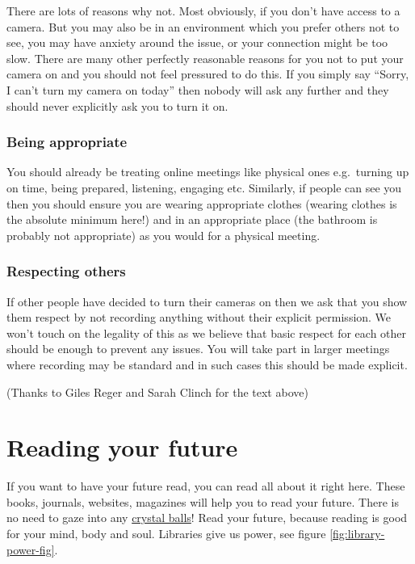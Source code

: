 \documentclass[
]{book}
\begin{document}
There are lots of reasons why not. Most obviously, if you don't have access to a camera. But you may also be in an environment which you prefer others not to see, you may have anxiety around the issue, or your connection might be too slow. There are many other perfectly reasonable reasons for you not to put your camera on and you should not feel pressured to do this. If you simply say ``Sorry, I can't turn my camera on today'' then nobody will ask any further and they should never explicitly ask you to turn it on.

\hypertarget{being-appropriate}{%
\subsection{Being appropriate}\label{being-appropriate}}

You should already be treating online meetings like physical ones e.g.~turning up on time, being prepared, listening, engaging etc. Similarly, if people can see you then you should ensure you are wearing appropriate clothes (wearing clothes is the absolute minimum here!) and in an appropriate place (the bathroom is probably not appropriate) as you would for a physical meeting.

\hypertarget{respecting-others}{%
\subsection{Respecting others}\label{respecting-others}}

If other people have decided to turn their cameras on then we ask that you show them respect by not recording anything without their explicit permission. We won't touch on the legality of this as we believe that basic respect for each other should be enough to prevent any issues. You will take part in larger meetings where recording may be standard and in such cases this should be made explicit.

(Thanks to Giles Reger and Sarah Clinch for the text above)

\hypertarget{reading}{%
\chapter{Reading your future}\label{reading}}

If you want to have your future read, you can read all about it right here. These books, journals, websites, magazines will help you to read your future. There is no need to gaze into any \href{https://en.wikipedia.org/wiki/Crystal_ball}{crystal balls}! Read your future, because reading is good for your mind, body and soul. Libraries give us power, see figure \ref{fig:library-power-fig}.
\end{document}
